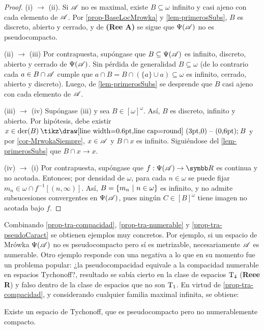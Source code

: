 \begin{proof}
	(i) $\rightarrow$ (ii). Si $\mathscr{A}$ no es maximal, existe $B \subseteq \omega$ infinito y casi ajeno con cada elemento de $\mathscr{A}$. Por \ref{prop-BaseLocMrowka} y \ref{lem-primerosSubs}, $B$ es discreto, abierto y cerrado, y de \textbf{(Ree A)} se sigue que $\Psi(\mathscr{A})$ no es pseudocompacto.

	(ii) $\rightarrow$ (iii) Por contrapuesta, supóngase que $B \subseteq \Psi(\mathscr{A})$ es infinito, discreto, abierto y cerrado de $\Psi(\mathscr{A})$. Sin pérdida de generalidad $B \subseteq \omega$ (de lo contrario cada $a \in B \cap \mathscr{A}$ cumple que $a \cap B = B \cap (\{a\} \cup a) \subseteq \omega$ es infinito, cerrado, abierto y discreto). Luego, de \ref{lem-primerosSubs} se desprende que $B$ casi ajeno con cada elemento de $\mathscr{A}$.

	(iii) $\rightarrow$ (iv) Supóngase (iii) y sea $B \in [\omega]^\omega $. Así, $B$ es discreto, infinito y abierto. Por hipótesis, debe existir $x \in \der(B) \setminus B$ y por \ref{cor-MrwokaSiempre}, $x \in \mathscr{A}$ y $B \cap x$ es infinito. Siguiéndose del \autoref{lem-primerosSubs} que $B \cap x \to x$.

	(iv) $\rightarrow$ (i) Por contrapuesta, supóngase que $f:\Psi(\ms{A}) \to \mathbb{R}$ es continua y no acotada. Entonces; por densidad de $\omega$, para cada $n \in \omega$ se puede fijar $m_n \in \omega \cap f^{-1}[(n,\infty)]$. Así, $B=\{m_n \text{ $|$ } n \in \omega\}$ es infinito, y no admite subsucesiones convergentes en $\Psi(\mathscr{A})$, pues ningún $C \in [B]^\omega$ tiene imagen no acotada bajo $f$.
\end{proof}

Combinando \ref{prop-tra-compacidad}, \ref{prop-tra-numerable} y \ref{prop-tra-pseudoCaract} se obtienen ejemplos muy concretos. Por ejemplo, si un espacio de Mrówka $\Psi(\mathscr{A})$ no es pseudocompacto pero sí es metrizable, necesariamente $\mathscr{A}$ es numerable. Otro ejemplo responde con una negativa a lo que en su momento fue un problema popular: ¿la pseudocompacidad equivale a la compacidad numerable en espacios Tychonoff?, resultado se sabía cierto en la clase de espacios $\operatorname{T}_4$ (\textbf{Reee R}) y falso dentro de la clase de espacios que no son $\operatorname{T}_1$. En virtud de \ref{prop-tra-compacidad}, y considerando cualquier familia maximal infinita, se obtiene:

\begin{corolario}\label{cor-EjmPseudoNoNumC}
	Existe un espacio de Tychonoff, que es pseudocompacto pero no numerablemente compacto.
\end{corolario}

